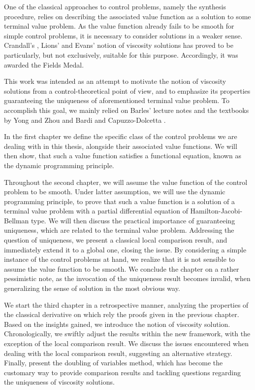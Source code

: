 \newpage

One of the classical approaches to control problems, namely the synthesis procedure, relies on describing the associated value function as a solution to some terminal value problem. As the value function already fails to be smooth for simple control problems, it is necessary to consider solutions in a weaker sense.
Crandall's \cite{lions}, Lions' \cite{lions1982fully, lions1982generalized} and Evans' \cite{crandall1984some} notion of viscosity solutions has proved to be particularly, but not exclusively, suitable for this purpose. Accordingly, it was awarded the Fields Medal.

This work was intended as an attempt to motivate the notion of viscosity solutions from a control-theoretical point of view, and to emphasize its properties guaranteeing the uniqueness of aforementioned terminal value problem. To accomplish this goal, we mainly relied on Barles' lecture notes \cite{barles} and the textbooks by Yong and Zhou \cite{zhou} and Bardi and Capuzzo-Dolcetta \cite{bardi2008optimal}.

In the first chapter we define the specific class of the control problems we are dealing with in this thesis, alongside their associated value functions. We will then show, that such a value function satisfies a functional equation, known as the dynamic programming principle.

Throughout the second chapter, we will assume the value function of the control problem to be smooth. Under latter assumption, we will use the dynamic programming principle, to prove that such a value function is a solution of a terminal value problem with a partial differential equation of Hamilton-Jacobi-Bellman type. We will then discuss the practical importance of guaranteeing uniqueness, which are related to the terminal value problem. Addressing the question of uniqueness, we present a classical local comparison result, and immediately extend it to a global one, closing the issue. By considering a simple instance of the control problems at hand, we realize that it is not sensible to assume the value function to be smooth. We conclude the chapter on a rather pessimistic note, as the invocation of the uniqueness result becomes invalid, when generalizing the sense of solution in the most obvious way.

We start the third chapter in a retrospective manner, analyzing the properties of the classical derivative on which rely the proofs given in the previous chapter. Based on the insights gained, we introduce the notion of viscosity solution. Chronologically, we swiftly adjust the results within the new framework, with the exception of the local comparison result. We discuss the issues encountered when dealing with the local comparison result, suggesting an alternative strategy. Finally, present the doubling of variables method, which has become the customary way to provide comparison results and tackling questions regarding the uniqueness of viscosity solutions.

